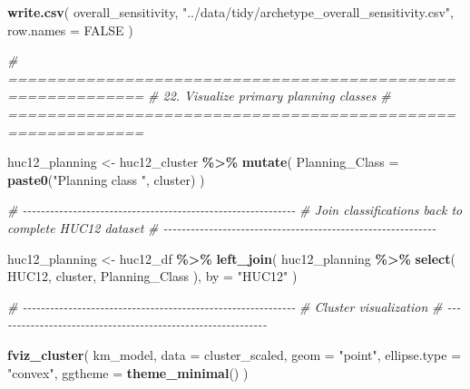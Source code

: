 \documentclass[
]{article}
\newenvironment{Shaded}{\begin{snugshade}}{\end{snugshade}}
\newcommand{\AttributeTok}[1]{\textcolor[rgb]{0.13,0.29,0.53}{#1}}
\newcommand{\CommentTok}[1]{\textcolor[rgb]{0.56,0.35,0.01}{\textit{#1}}}
\newcommand{\ConstantTok}[1]{\textcolor[rgb]{0.56,0.35,0.01}{#1}}
\newcommand{\FunctionTok}[1]{\textcolor[rgb]{0.13,0.29,0.53}{\textbf{#1}}}
\newcommand{\NormalTok}[1]{#1}
\newcommand{\OtherTok}[1]{\textcolor[rgb]{0.56,0.35,0.01}{#1}}
\newcommand{\SpecialCharTok}[1]{\textcolor[rgb]{0.81,0.36,0.00}{\textbf{#1}}}
\newcommand{\StringTok}[1]{\textcolor[rgb]{0.31,0.60,0.02}{#1}}
\begin{document}
\begin{Shaded}
\begin{Highlighting}[]
\FunctionTok{write.csv}\NormalTok{(}
\NormalTok{  overall\_sensitivity,}
  \StringTok{"../data/tidy/archetype\_overall\_sensitivity.csv"}\NormalTok{,}
  \AttributeTok{row.names =} \ConstantTok{FALSE}
\NormalTok{)}


\CommentTok{\# ============================================================}
\CommentTok{\# 22. Visualize primary planning classes}
\CommentTok{\# ============================================================}

\NormalTok{huc12\_planning }\OtherTok{\textless{}{-}}\NormalTok{ huc12\_cluster }\SpecialCharTok{\%\textgreater{}\%}
  \FunctionTok{mutate}\NormalTok{(}
    \AttributeTok{Planning\_Class =}
      \FunctionTok{paste0}\NormalTok{(}\StringTok{"Planning class "}\NormalTok{, cluster)}
\NormalTok{  )}


\CommentTok{\# {-}{-}{-}{-}{-}{-}{-}{-}{-}{-}{-}{-}{-}{-}{-}{-}{-}{-}{-}{-}{-}{-}{-}{-}{-}{-}{-}{-}{-}{-}{-}{-}{-}{-}{-}{-}{-}{-}{-}{-}{-}{-}{-}{-}{-}{-}{-}{-}{-}{-}{-}{-}{-}{-}{-}{-}{-}{-}{-}{-}}
\CommentTok{\# Join classifications back to complete HUC12 dataset}
\CommentTok{\# {-}{-}{-}{-}{-}{-}{-}{-}{-}{-}{-}{-}{-}{-}{-}{-}{-}{-}{-}{-}{-}{-}{-}{-}{-}{-}{-}{-}{-}{-}{-}{-}{-}{-}{-}{-}{-}{-}{-}{-}{-}{-}{-}{-}{-}{-}{-}{-}{-}{-}{-}{-}{-}{-}{-}{-}{-}{-}{-}{-}}

\NormalTok{huc12\_planning }\OtherTok{\textless{}{-}}\NormalTok{ huc12\_df }\SpecialCharTok{\%\textgreater{}\%}
  \FunctionTok{left\_join}\NormalTok{(}
\NormalTok{    huc12\_planning }\SpecialCharTok{\%\textgreater{}\%}
      \FunctionTok{select}\NormalTok{(}
\NormalTok{        HUC12,}
\NormalTok{        cluster,}
\NormalTok{        Planning\_Class}
\NormalTok{      ),}
    \AttributeTok{by =} \StringTok{"HUC12"}
\NormalTok{  )}


\CommentTok{\# {-}{-}{-}{-}{-}{-}{-}{-}{-}{-}{-}{-}{-}{-}{-}{-}{-}{-}{-}{-}{-}{-}{-}{-}{-}{-}{-}{-}{-}{-}{-}{-}{-}{-}{-}{-}{-}{-}{-}{-}{-}{-}{-}{-}{-}{-}{-}{-}{-}{-}{-}{-}{-}{-}{-}{-}{-}{-}{-}{-}}
\CommentTok{\# Cluster visualization}
\CommentTok{\# {-}{-}{-}{-}{-}{-}{-}{-}{-}{-}{-}{-}{-}{-}{-}{-}{-}{-}{-}{-}{-}{-}{-}{-}{-}{-}{-}{-}{-}{-}{-}{-}{-}{-}{-}{-}{-}{-}{-}{-}{-}{-}{-}{-}{-}{-}{-}{-}{-}{-}{-}{-}{-}{-}{-}{-}{-}{-}{-}{-}}

\FunctionTok{fviz\_cluster}\NormalTok{(}
\NormalTok{  km\_model,}
  \AttributeTok{data =}\NormalTok{ cluster\_scaled,}
  \AttributeTok{geom =} \StringTok{"point"}\NormalTok{,}
  \AttributeTok{ellipse.type =} \StringTok{"convex"}\NormalTok{,}
  \AttributeTok{ggtheme =} \FunctionTok{theme\_minimal}\NormalTok{()}
\NormalTok{)}
\end{Highlighting}
\end{Shaded}
\end{document}
